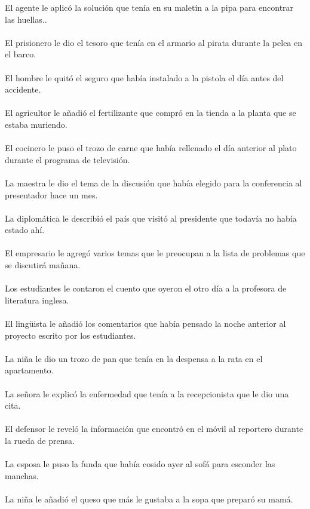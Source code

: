 El agente le aplicó la solución que tenía en su maletín a la pipa para encontrar las huellas..	\\	\\
El prisionero le dio el tesoro que tenía en el armario al pirata durante la pelea en el barco.	\\	\\
El hombre le quitó el seguro que había instalado a la pistola el día antes del accidente.	\\	\\
El agricultor le añadió el fertilizante que compró en la tienda a la planta que se estaba muriendo.	\\	\\
El cocinero le puso el trozo de carne que había rellenado el día anterior al plato durante el programa de televisión.	\\	\\
La maestra le dio el tema de la discusión que había elegido para la conferencia al presentador hace un mes.	\\	\\
La diplomática le describió el país que visitó al presidente que todavía no había estado ahí.	\\	\\
El empresario le agregó varios temas que le preocupan a la lista de problemas que se discutirá mañana.	\\	\\
Los estudiantes le contaron el cuento que oyeron el otro día a la profesora de literatura inglesa.	\\	\\
El lingüista le añadió los comentarios que había pensado la noche anterior al proyecto escrito por los estudiantes.	\\	\\
La niña le dio un trozo de pan que tenía en la despensa a la rata en el apartamento.	\\	\\
La señora le explicó la enfermedad que tenía a la recepcionista que le dio una cita.	\\	\\
El defensor le reveló la información que encontró en el móvil al reportero durante la rueda de prensa.	\\	\\
La esposa le puso la funda que había cosido ayer  al sofá para esconder las manchas.	\\	\\
La niña le añadió el queso que más le gustaba a la sopa que preparó su mamá.	\\	\\
